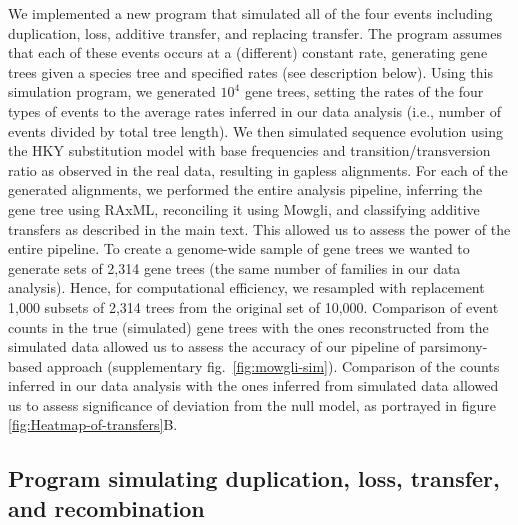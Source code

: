 \documentclass[12pt]{article}
\providecommand{\\}{\\}
\begin{document}
We implemented a new program that simulated all of the four events including
duplication, loss, additive transfer, and replacing transfer.  The program
assumes that each of these events occurs at a (different) constant rate, 
generating gene trees given a species tree and specified rates (see description
below). Using this simulation program, we generated $10^4$ gene trees, setting
the rates of the four types of events to the average rates inferred in our data
analysis (i.e., number of events divided by total tree length). We then
simulated sequence evolution using the HKY substitution model 
\citep{Hasegawa1985}
with base
frequencies and transition/transversion ratio as observed in the real data,
resulting in gapless alignments.
For each of the generated alignments, we performed the entire analysis pipeline,
inferring the gene tree using RAxML, reconciling it using Mowgli, and classifying
additive transfers as described in the main text. This allowed
us to assess the power of the entire pipeline. To create a genome-wide sample of
gene trees we wanted to generate sets of 2,314 gene trees (the same number of
families in our data analysis). Hence, for computational efficiency, we
resampled with replacement 1,000 subsets of 2,314 trees from the original set of
10,000. Comparison of event counts in the true (simulated) gene trees with the
ones reconstructed from the simulated data 
allowed us to assess the accuracy of our pipeline of parsimony-based approach
(supplementary fig.\ \ref{fig:mowgli-sim}).
Comparison of the counts inferred in our data analysis with the
ones inferred from simulated data allowed us to assess significance of deviation
from the null model, as portrayed in figure \ref{fig:Heatmap-of-transfers}B.

\subsection{Program simulating duplication, loss, transfer, and recombination}
\end{document}
